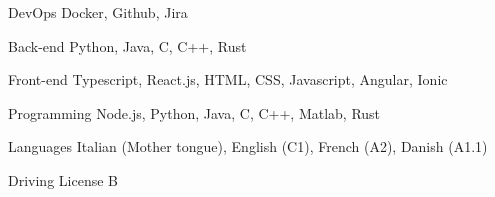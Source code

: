 

\begin{cvskills}


  \cvskill
    {DevOps} %
    {Docker, Github, Jira} %

  \cvskill
    {Back-end} %
    {Python, Java, C, C++, Rust} %

  \cvskill
    {Front-end} %
    {Typescript, React.js, HTML, CSS, Javascript, Angular, Ionic} %

  \cvskill
    {Programming} %
    {Node.js, Python, Java, C, C++, Matlab, Rust} %

  \cvskill
    {Languages} %
    {Italian (Mother tongue), English (C1), French (A2), Danish (A1.1)} %

  \cvskill
    {Driving License} %
    {B} %

\end{cvskills}

